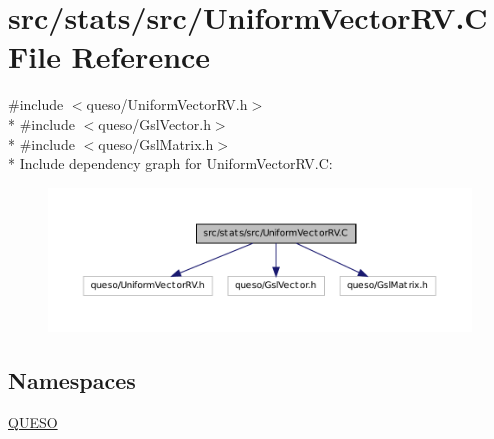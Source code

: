 \hypertarget{_uniform_vector_r_v_8_c}{\section{src/stats/src/\-Uniform\-Vector\-R\-V.C File Reference}
\label{_uniform_vector_r_v_8_c}
}
{\ttfamily \#include $<$queso/\-Uniform\-Vector\-R\-V.\-h$>$}\\*
{\ttfamily \#include $<$queso/\-Gsl\-Vector.\-h$>$}\\*
{\ttfamily \#include $<$queso/\-Gsl\-Matrix.\-h$>$}\\*
Include dependency graph for Uniform\-Vector\-R\-V.\-C\-:
\nopagebreak
\begin{figure}[H]
\begin{center}
\leavevmode
\includegraphics[width=350pt]{_uniform_vector_r_v_8_c__incl}
\end{center}
\end{figure}
\subsection*{Namespaces}
\begin{DoxyCompactItemize}
\item 
\hyperlink{namespace_q_u_e_s_o}{Q\-U\-E\-S\-O}
\end{DoxyCompactItemize}
